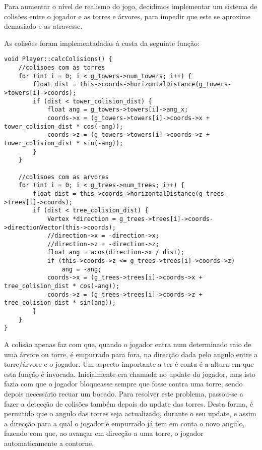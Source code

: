 Para aumentar o nível de realismo do jogo, decidimos implementar um sistema de colisões entre o jogador e as torres e árvores, para impedir que este se aproxime demasiado e as atravesse.

As colisões foram implementadadas à custa da seguinte função:

\begin{lstlisting}
void Player::calcColisions() {
	//colisoes com as torres
	for (int i = 0; i < g_towers->num_towers; i++) {
		float dist = this->coords->horizontalDistance(g_towers->towers[i]->coords);
		if (dist < tower_colision_dist) {
			float ang = g_towers->towers[i]->ang_x;
			coords->x = (g_towers->towers[i]->coords->x + tower_colision_dist * cos(-ang));
			coords->z = (g_towers->towers[i]->coords->z + tower_colision_dist * sin(-ang));
		}
	}
	
	//colisoes com as arvores
	for (int i = 0; i < g_trees->num_trees; i++) {
		float dist = this->coords->horizontalDistance(g_trees->trees[i]->coords);
		if (dist < tree_colision_dist) {
			Vertex *direction = g_trees->trees[i]->coords->directionVector(this->coords);
			//direction->x = -direction->x;
			//direction->z = -direction->z;
			float ang = acos(direction->x / dist);
			if (this->coords->z <= g_trees->trees[i]->coords->z)
				ang = -ang;
			coords->x = (g_trees->trees[i]->coords->x + tree_colision_dist * cos(-ang));
			coords->z = (g_trees->trees[i]->coords->z + tree_colision_dist * sin(ang));
		}
	}
}
\end{lstlisting}

A colisão apenas faz com que, quando o jogador entra num determinado raio de uma árvore ou torre, é empurrado para fora, na direcção dada pelo angulo entre a torre/árvore e o jogador.
Um aspecto importante a ter é conta é a altura em que esta função é invocada.
Inicialmente era chamada no update do jogador, mas isto fazia com que o jogador bloqueasse sempre que fosse contra uma torre, sendo depois necessário recuar um bocado.
Para resolver este problema, passou-se a fazer a detecção de colisões também depois do update das torres. Desta forma, é permitido que o angulo das torres seja actualizado, durante o seu update, e assim a direcção para a qual o jogador é empurrado já tem em conta o novo angulo, fazendo com que, ao avançar em direcção a uma torre, o jogador automaticamente a contorne.
